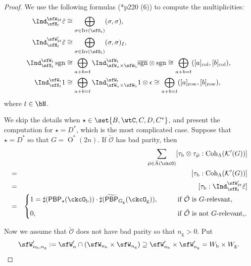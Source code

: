 \documentclass[12pt,a4paper]{amsart}
\newcommand{\CK}{{\mathcal {K}}}
\newcommand{\CO}{{\mathcal {O}}}
\newcommand{\sgn}{\operatorname{sgn}}
\newcommand{\oO}{\operatorname{O}}
\numberwithin{equation}{section}
\theoremstyle{remark}
\def\Irr{\mathrm{Irr}}
\def\bsgn{\overline{\sgn}}
\def\nbb{n_{\mathrm b}}
\def\ngg{n_{\mathrm g}}
\def\Coh{\mathrm{Coh}}
\def\tPBP{\widetilde{\mathsf{PBP}}}
\def\PBP{\mathsf{PBP}}
\def\tPBP{\widetilde{\mathsf{PBP}}}
\begin{document}
 \begin{proof}
   We use the following
  formulas (\cite{Mc}*{p220 (6)})  to compute the multiplicities:
  \begin{equation}\label{eq:indSW}
    \begin{split}
      \Ind_{\sfH_{t}}^{\sfW_{2t}} \tilde{\varepsilon}& \cong   \bigoplus_{\sigma\in \Irr(\sfS_{t})} (\sigma,\sigma),\\
      \Ind_{\sfH_{t}}^{\sfW'_{2t}} \tilde{\varepsilon} &\cong  \bigoplus_{\sigma\in \Irr(\sfS_{t})} (\sigma,\sigma)_{I},\\
      \Ind_{\sfS_{t}}^{\sfW_{t}}\sgn &\cong \bigoplus_{a+b=t}\Ind_{\sfW_{a}\times \sfW_{\mathrm b}}^{\sfW_{t}} \bsgn\otimes \sgn \cong \bigoplus_{a+b=t} ([a]_{\mathrm{col}},[b]_{\mathrm{col}}),\\
      \Ind_{\sfS_{t}}^{\sfW_{t}} 1 &\cong \bigoplus_{a+b=t}\Ind_{\sfW_{a}\times \sfW_{\mathrm b}}^{\sfW_{t}} 1 \otimes \epsilon \cong \bigoplus_{a+b=t} ([a]_{\mathrm{row}},[b]_{\mathrm{row}}),
    \end{split}
\end{equation}
where $t\in \bN$.

We skip the details when $\star \in \set{B,\wtC, C,D,C^{*}}$, and present the computation for $\star = D^{*}$, which is the most complicated case.
 Suppose that $\star=D^*$ so that $G=\oO^*(2n)$.  If $\check \CO$ has bad parity, then
  \begin{eqnarray*}
 && \sum_{\bar \wp\in \bar{\mathrm A}(\ckcO)} [\tau_{\mathrm b}\otimes \tau_{\bar \wp}: \Coh_{\Lambda} (\CK'(G))] \medskip \\
 &=&[\tau_{\mathrm b} : \Coh_{\Lambda} (\CK'(G))] \medskip \\
 &=& [\tau_\mathrm b:\Ind_{\sfH_{t}}^{\sfW'_{2t}} \tilde{\varepsilon}] \medskip \\
& =& \begin{cases}
    1=\sharp (\PBP_{\star}(\ckcO_{\mathrm b}))\cdot \sharp(\tPBP_{G_{\mathrm g}}(\ckcO_{\mathrm g})),  \qquad &  \text{if $\check \CO$ is $G$-relevant,}\medskip \\
          0, \qquad & \text{if $\check \CO$ is not $G$-relevant,.}
       \end{cases}
  \end{eqnarray*}


Now we assume that $\check \CO$ does not have bad parity so that $n_\mathrm g>0$.
 Put
 \[
   \sfW'_{\nbb, \ngg}:=\sfW'_n\cap (\sfW_{\nbb}\times \sfW_{\ngg})\supseteq \sfW'_{\nbb}\times \sfW'_{\ngg}= W_{\mathrm b}\times W_{\mathrm g}.
 \]



\end{proof}
\end{document}
